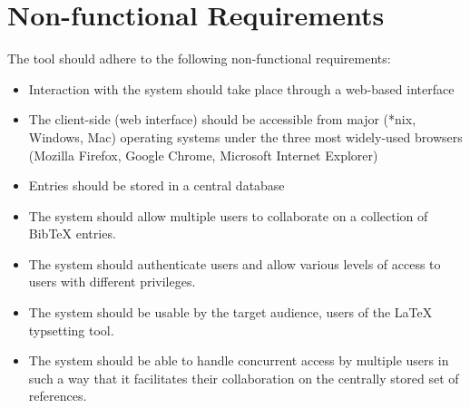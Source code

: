 \documentclass{l3proj}
\newcommand{\BibTeX}{B{\sc ib}\TeX}
\begin{document}
\section*{Non-functional Requirements}
The tool should adhere to the following non-functional requirements:
\begin{itemize}
\item Interaction with the system should take place through a web-based interface
\item The client-side (web interface) should be accessible from major (*nix, Windows, Mac) operating systems under the three most widely-used browsers (Mozilla Firefox, Google Chrome, Microsoft Internet Explorer)
\item Entries should be stored in a central database
\item The system should allow multiple users to collaborate on a collection of \BibTeX{} entries.
\item The system should authenticate users and allow various levels of access to users with different privileges.
\item The system should be usable by the target audience, users of the LaTeX typsetting tool.
\item The system should be able to handle concurrent access by multiple users in such a way that it facilitates their collaboration on the centrally stored set of references.
\end{itemize}







%

%

%






%
%
%
%
%
%


%



%


\end{document}
